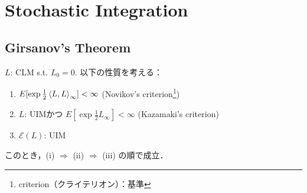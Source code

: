 \documentclass{jsarticle}
\title{}
\author{}
\date{
}
\begin{document}
\setcounter{section}{4}
\section{Stochastic Integration}
\setcounter{subsection}{4}
\subsection{Girsanov's Theorem}

\setcounter{thm}{22}
\begin{shadebox}
    \begin{thm}
    \label{thm:523}
        $L$: CLM s.t. $L_0=0.$
        以下の性質を考える：
        \begin{enumerate}[label=(\roman*)]
            \item
            $E[\exp\frac{1}{2}\left\langle L,L\right\rangle_{\infty}]<\infty$
            (Novikov's criterion\footnote{criterion（クライテリオン）：基準})
            \item
            $L$: UIMかつ $E[\exp\frac{1}{2}L_{\infty}]<\infty$
            (Kazamaki's criterion)
            \item
            $\mathcal{E}(L)$: UIM
        \end{enumerate}
        このとき，(i) $\Rightarrow$ (ii) $\Rightarrow$ (iii) の順で成立．
    \end{thm}
\end{shadebox}
\end{document}
